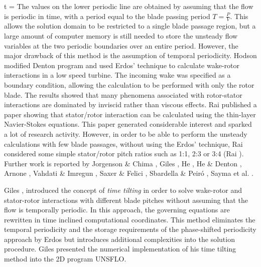 %
\beq
  \Delta t = 
\eeq
%
 The values on the lower periodic line are obtained by assuming that the flow is
 periodic in time, with a period equal to the blade passing period $T = \frac{P}{V}$.
 This allows the solution domain to be restricted to a single blade passage region,
 but a large amount of computer memory is still needed to store the unsteady
 flow variables at the two periodic boundaries over an entire period.
 However, the major drawback of this method is the assumption of
 temporal periodicity.
 Hodson \citeyear{Hodson:1} modified Denton \citeyear{Denton:3} program and
 used Erdos' technique to calculate wake-rotor interactions in a low speed
 turbine. The incoming wake was specified as a boundary
 condition, allowing the calculation to be performed with only the rotor blade.
 The results showed that many phenomena associated with rotor-stator
 interactions are dominated by inviscid rather than viscous effects.
 Rai \citeyear{Rai:1} published a paper showing that stator/rotor interaction
 can be calculated using the thin-layer Navier-Stokes equations.
 This paper generated considerable interest and sparked a lot of research activity.
 However, in order to be able to perform the unsteady calculations with few blade passages,
 without using the Erdos' technique, Rai considered some simple stator/rotor pitch
 ratios such as 1:1, 2:3 or 3:4 (Rai ).
 Further work is reported by Jorgenson \& Chima \citeyear{Chima:1},
 Giles \citeyear{Giles:3}, He \citeyear{He:1},
 He \& Denton \citeyear{He:2,He:3},
 Arnone \citeyear{Arnone:1},
 Vahdati \& Imregun \citeyear{Mehdi:3},
 Saxer \& Felici \citeyear{Saxer:1},
 Sbardella \& Peir\'{o} \citeyear{Luca:1},
 Sayma et al. \citeyear{Luca:10}.

 Giles \citeyear{Giles:2,Giles:3}, introduced the concept of
 {\em time tilting} in order to solve wake-rotor and stator-rotor
 interactions with different blade pitches without assuming that the flow
 is temporally periodic.
 In this approach, the governing equations are rewritten in time
 inclined computational coordinates.
 This method eliminates the temporal periodicity and the storage requirements
 of the phase-shifted periodicity approach by Erdos but introduces additional
 complexities into the solution procedure.
 Giles \citeyear{Giles:4} presented the numerical
 implementation of his time tilting method into
 the 2D program UNSFLO.

